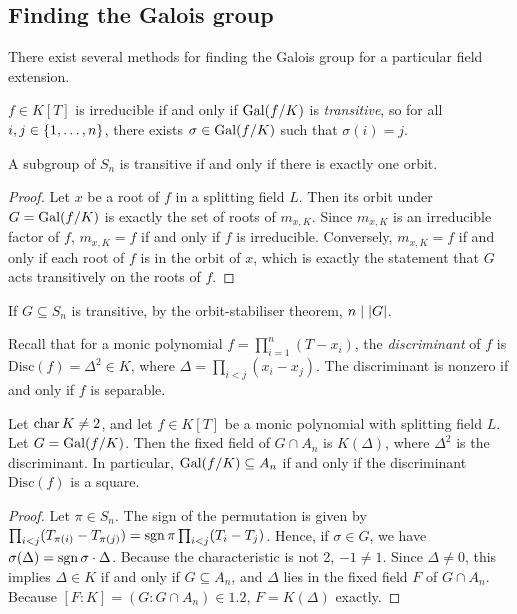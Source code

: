 \subsection{Finding the Galois group}
There exist several methods for finding the Galois group for a particular field extension.
\begin{proposition}
	\( f \in K[T] \) is irreducible if and only if \( \operatorname{Gal}(f/K) \) is \emph{transitive}, so for all \( i, j \in \qty{1, \dots, n} \), there exists \( \sigma \in \operatorname{Gal}(f/K) \) such that \( \sigma(i) = j \).
\end{proposition}
\begin{remark}
	A subgroup of \( S_n \) is transitive if and only if there is exactly one orbit.
\end{remark}
\begin{proof}
	Let \( x \) be a root of \( f \) in a splitting field \( L \).
	Then its orbit under \( G = \operatorname{Gal}(f/K) \) is exactly the set of roots of \( m_{x,K} \).
	Since \( m_{x,K} \) is an irreducible factor of \( f \), \( m_{x,K} = f \) if and only if \( f \) is irreducible.
	Conversely, \( m_{x,K} = f \) if and only if each root of \( f \) is in the orbit of \( x \), which is exactly the statement that \( G \) acts transitively on the roots of \( f \).
\end{proof}
\begin{remark}
	If \( G \subseteq S_n \) is transitive, by the orbit-stabiliser theorem, \( n \mid \abs{G} \).
\end{remark}
Recall that for a monic polynomial \( f = \prod_{i=1}^n (T - x_i) \), the \emph{discriminant} of \( f \) is \( \mathrm{Disc}(f) = \Delta^2 \in K \), where \( \Delta = \prod_{i < j} (x_i - x_j) \).
The discriminant is nonzero if and only if \( f \) is separable.
\begin{proposition}
	Let \( \operatorname{char} K \neq 2 \), and let \( f \in K[T] \) be a monic polynomial with splitting field \( L \).
	Let \( G = \operatorname{Gal}(f/K) \).
	Then the fixed field of \( G \cap A_n \) is \( K(\Delta) \), where \( \Delta^2 \) is the discriminant.
	In particular, \( \operatorname{Gal}(f/K) \subseteq A_n \) if and only if the discriminant \( \mathrm{Disc}(f) \) is a square.
\end{proposition}
\begin{proof}
	Let \( \pi \in S_n \).
	The sign of the permutation is given by \( \prod_{i < j} (T_{\pi(i)} - T_{\pi(j)}) = \operatorname{sgn} \pi \prod_{i < j} (T_i - T_j) \).
	Hence, if \( \sigma \in G \), we have \( \sigma(\Delta) = \operatorname{sgn} \sigma \cdot \Delta \).
	Because the characteristic is not 2, \( -1 \neq 1 \).
	Since \( \Delta \neq 0 \), this implies \( \Delta \in K \) if and only if \( G \subseteq A_n \), and \( \Delta \) lies in the fixed field \( F \) of \( G \cap A_n \).
	Because \( [F : K] = (G : G \cap A_n) \in \qty{1, 2} \), \( F = K(\Delta) \) exactly.
\end{proof}
